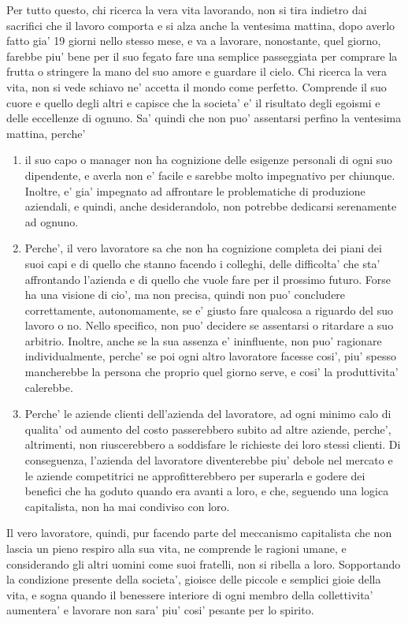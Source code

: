 Per tutto questo, chi ricerca la vera vita lavorando, non si tira indietro dai sacrifici che il lavoro comporta e si alza anche la ventesima mattina, dopo averlo fatto gia' 19 giorni nello stesso mese, e va a lavorare, nonostante, quel giorno, farebbe piu' bene per il suo fegato fare una semplice passeggiata per comprare la frutta o stringere la mano del suo amore e guardare il cielo. Chi ricerca la vera vita, non si vede schiavo ne' accetta il mondo come perfetto. Comprende il suo cuore e quello degli altri e capisce che la societa' e' il risultato degli egoismi e delle eccellenze di ognuno. Sa' quindi che non puo' assentarsi perfino la ventesima mattina, perche'
\begin{enumerate}
    \item il suo capo o manager non ha cognizione delle esigenze personali di ogni suo dipendente, e averla non e' facile e sarebbe molto impegnativo per chiunque. Inoltre, e' gia' impegnato ad affrontare le problematiche di produzione aziendali, e quindi, anche desiderandolo, non potrebbe dedicarsi serenamente ad ognuno.
    \item Perche', il vero lavoratore sa che non ha cognizione completa dei piani dei suoi capi e di quello che stanno facendo i colleghi, delle difficolta' che sta' affrontando l'azienda e di quello che vuole fare per il prossimo futuro.
   Forse ha una visione di cio', ma non precisa, quindi non puo' concludere correttamente, autonomamente, se e' giusto fare qualcosa a riguardo del suo lavoro o no. Nello specifico, non puo' decidere se assentarsi o ritardare a suo arbitrio. Inoltre, anche se la sua assenza e' ininfluente, non puo' ragionare individualmente, perche' se poi ogni altro lavoratore facesse cosi', piu' spesso mancherebbe la persona che proprio quel giorno serve, e cosi' la produttivita' calerebbe.
    \item Perche' le aziende clienti dell'azienda del lavoratore, ad ogni minimo calo di qualita' od aumento del costo passerebbero subito ad altre aziende, perche', altrimenti, non riuscerebbero a soddisfare le richieste dei loro stessi clienti. Di conseguenza, l'azienda del lavoratore diventerebbe piu' debole nel mercato e le aziende competitrici ne approfitterebbero per superarla e godere dei benefici che ha goduto quando era avanti a loro, e che, seguendo una logica capitalista, non ha mai condiviso con loro.

\end{enumerate}
Il vero lavoratore, quindi, pur facendo parte del meccanismo capitalista che non lascia un pieno respiro alla sua vita,  ne comprende le ragioni umane, e considerando gli altri uomini come suoi fratelli, non si ribella a loro. Sopportando la condizione presente della societa', gioisce delle piccole e semplici gioie della vita, e sogna quando il benessere interiore di ogni membro della collettivita' aumentera' e lavorare non sara' piu' cosi' pesante per lo spirito.

